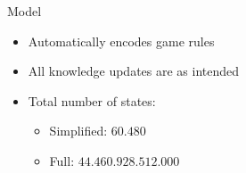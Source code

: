 \begin{frame}{Model}
    \begin{itemize}
        \item Automatically encodes game rules
        \item All knowledge updates are as intended
        \item Total number of states:
            \begin{itemize}
                \item Simplified: $60.480$
                    \pause
                \item Full: $44.460.928.512.000$
            \end{itemize}
    \end{itemize}
\end{frame}
